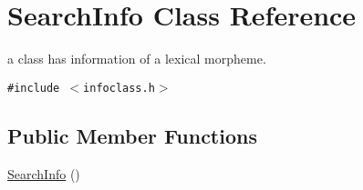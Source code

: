 \hypertarget{classSearchInfo}{
\section{SearchInfo Class Reference}
\label{classSearchInfo}
}
a class has information of a lexical morpheme.  


{\tt \#include $<$infoclass.h$>$}

\subsection*{Public Member Functions}
\begin{CompactItemize}
\item 
\hyperlink{classSearchInfo_da258dde857ea529cad08b93c8f01aa2}{SearchInfo} ()
\end{CompactItemize}
